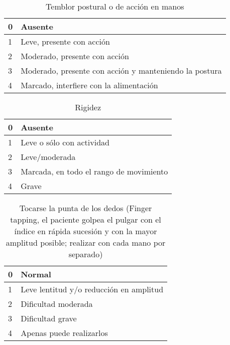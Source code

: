 \begin{table}[H]
\begin{center}
\begin{tabular}{|p{1cm}|p{11cm}|}
\hline
0 & Ausente \\\hline
1 & Leve, presente con acción \\\hline
2 & Moderado, presente con acción\\\hline
3 & Moderado, presente con acción y manteniendo la postura \\\hline
4 & Marcado, interfiere con la alimentación\\\hline
\end{tabular}
\caption{Temblor postural o de acción en manos}
\end{center}
\end{table}

\begin{table}[H]
\begin{center}
\begin{tabular}{|p{1cm}|p{11cm}|}
\hline
0 & Ausente \\\hline
1 & Leve o sólo con actividad \\\hline
2 & Leve/moderada\\\hline
3 &  Marcada, en todo el rango de movimiento \\\hline
4 & Grave\\\hline
\end{tabular}
\caption{Rigidez}
\end{center}
\end{table}


\begin{table}[H]
\begin{center}
\begin{tabular}{|p{1cm}|p{11cm}|}
\hline
0 & Normal \\\hline
1 & Leve lentitud y/o reducción en amplitud \\\hline
2 & Dificultad moderada\\\hline
3 & Dificultad grave \\\hline
4 & Apenas puede realizarlos\\\hline
\end{tabular}
\caption{Tocarse la punta de los dedos (Finger tapping, el paciente golpea el pulgar con el índice en rápida sucesión y con la mayor amplitud posible; realizar con cada mano por separado)}
\end{center}
\end{table}

